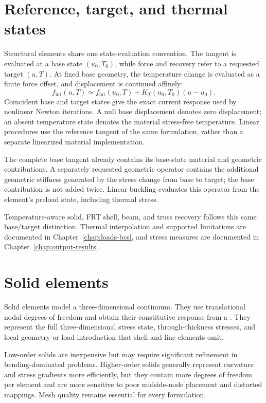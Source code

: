 \section{Reference, target, and thermal states}

Structural elements share one state-evaluation convention. The tangent is evaluated at a base state \((u_0,T_0)\), while force and recovery refer to a requested target \((u,T)\). At fixed base geometry, the temperature change is evaluated as a finite force offset, and displacement is continued affinely:
\[
f_{\mathrm{int}}(u,T)\simeq
f_{\mathrm{int}}(u_0,T)+K_T(u_0,T_0)(u-u_0).
\]
Coincident base and target states give the exact current response used by nonlinear Newton iterations. A null base displacement denotes zero displacement; an absent temperature state denotes the material stress-free temperature. Linear procedures use the reference tangent of the same formulation, rather than a separate linearized material implementation.

The complete base tangent already contains its base-state material and geometric contributions. A separately requested geometric operator contains the additional geometric stiffness generated by the stress change from base to target; the base contribution is not added twice. Linear buckling evaluates this operator from the element's preload state, including thermal stress.

Temperature-aware solid, FRT shell, beam, and truss recovery follows this same base/target distinction. Thermal interpolation and supported limitations are documented in Chapter~\ref{chap:loads-bcs}, and stress measures are documented in Chapter~\ref{chap:output-results}.

\section{Solid elements}

Solid elements model a three-dimensional continuum. They use translational nodal degrees of freedom and obtain their constitutive response from a . They represent the full three-dimensional stress state, through-thickness stresses, and local geometry or load introduction that shell and line elements omit.

Low-order solids are inexpensive but may require significant refinement in bending-dominated problems. Higher-order solids generally represent curvature and stress gradients more efficiently, but they contain more degrees of freedom per element and are more sensitive to poor midside-node placement and distorted mappings. Mesh quality remains essential for every formulation.

